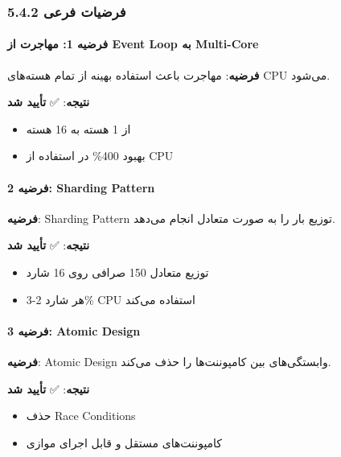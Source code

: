 \documentclass[
]{article}
\providecommand{\tightlist}{%
  \setlength{\itemsep}{0pt}\setlength{\parskip}{0pt}}
\begin{document}
\subsubsection{5.4.2 فرضیات
فرعی}\label{ux641ux631ux636ux6ccux627ux62a-ux641ux631ux639ux6cc}

\paragraph{فرضیه 1: مهاجرت از Event Loop به
Multi-Core}\label{ux641ux631ux636ux6ccux647-1-ux645ux647ux627ux62cux631ux62a-ux627ux632-event-loop-ux628ux647-multi-core}

\textbf{فرضیه}: مهاجرت باعث استفاده بهینه از تمام هسته‌های CPU می‌شود.

\textbf{نتیجه}: ✅ \textbf{تأیید شد}

\begin{itemize}
\tightlist
\item
  از 1 هسته به 16 هسته
\item
  بهبود 400\% در استفاده از CPU
\end{itemize}

\paragraph{فرضیه 2: Sharding
Pattern}\label{ux641ux631ux636ux6ccux647-2-sharding-pattern}

\textbf{فرضیه}: Sharding Pattern توزیع بار را به صورت متعادل انجام
می‌دهد.

\textbf{نتیجه}: ✅ \textbf{تأیید شد}

\begin{itemize}
\tightlist
\item
  توزیع متعادل 150 صرافی روی 16 شارد
\item
  هر شارد 2-3\% CPU استفاده می‌کند
\end{itemize}

\paragraph{فرضیه 3: Atomic
Design}\label{ux641ux631ux636ux6ccux647-3-atomic-design}

\textbf{فرضیه}: Atomic Design وابستگی‌های بین کامپوننت‌ها را حذف می‌کند.

\textbf{نتیجه}: ✅ \textbf{تأیید شد}

\begin{itemize}
\tightlist
\item
  حذف Race Conditions
\item
  کامپوننت‌های مستقل و قابل اجرای موازی
\end{itemize}
\end{document}
